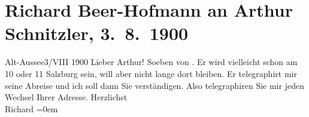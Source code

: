

         
         \renewcommand{\erwaehntePersonen}{Personen: Richard Beer-Hofmann, Paul Goldmann}
         \renewcommand{\erwaehnteOrte}{Orte: Altaussee, Bad Ischl, Salzburg}
         \renewcommand{\erwaehnteWerke}{}
               \section[Richard Beer-Hofmann an Arthur Schnitzler, 3. 8. 1900]{ Richard Beer-Hofmann an Arthur Schnitzler, 3. 8. 1900}\nopagebreak{}\rehead{ }\begin{ledgroupsized}[t]{13cm}\normalsize\beginnumbering \toendnotes[C]{\smallbreak\pagebreak[2]} 
\toendnotes[C]{\smallbreak}\pstart
           \raggedleft{}{\pb}Alt-Aussee3/VIII 1900\pend
           \pstart
           Lieber Arthur! Soeben von \label{K_L01064-1v}\label{K_L01064-1h}. Er wird vielleicht
               schon am 10 oder 11{ }Salzburg sein, will aber nicht lange dort bleiben.
                  Er telegraphirt mir seine Abreise und ich
               soll dann Sie verständigen. Also telegraphiren Sie mir jeden Wechsel Ihrer
               Adresse.\pend
           \pstart
           Herzlichst{\\[\baselineskip]}\spacefill\mbox{Richard}\pend
           \leftskip=0em{}
         
         \endnumbering{}\end{ledgroupsized}  \newcommand{\dateiname}{L01064}\newcommand{\titel}{Richard Beer-Hofmann an Arthur Schnitzler, 3. 8. 1900}\newcommand{\editorInnen}{Martin Anton Müller und Gerd-Hermann Susen}
      